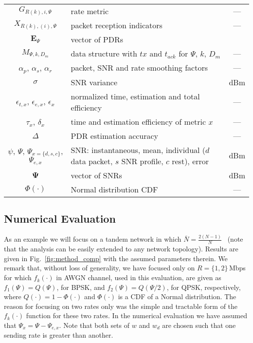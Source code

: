 \documentclass[11pt,draftclsnofoot,journal,onecolumn]{IEEEtran}
\begin{document}
\begin{table*}
\begin{tabular}{c|l|c}
  $G_{R(k),i,\Psi}$ & rate metric & --- \\
  $X_{R(k),(i),\Psi}$ & packet reception indicators & --- \\
  $\mathbf{E}_{\Psi}$ & vector of PDRs & \\
  $M_{\Psi,k,D_m}$ & data structure with $tx$ and $t_{ack}$ for $\Psi$, $k$, $D_m$ & --- \\
  $\alpha_p$, $\alpha_s$, $\alpha_r$ & packet, SNR and rate smoothing factors & --- \\
  $\sigma$ & SNR variance & dBm \\
  $\epsilon_{t,x}$, $\epsilon_{e,x}$, $\epsilon_{x}$ & normalized time, estimation and total efficiency & --- \\
  $\tau_x$, $\delta_x$ & time and estimation efficiency of metric $x$ & --- \\
  $\Delta$ & PDR estimation accuracy & --- \\
  $\psi$, $\Psi$, $\Psi_{x=\{d, s, c\}}$, $\Psi_{e,x}$ & SNR: instantaneous, mean, individual ($d$ data packet, $s$ SNR profile, $c$ rest), error & dBm \\
  $\mathbf{\Psi}$ & vector of SNRs & dBm\\
  $\Phi(\cdot)$ & Normal distribution CDF & --- \\
  \hline
\end{tabular}
\end{table*}

\subsection{Numerical Evaluation}

As an example we will focus on a tandem network in which $\bar{N}=\frac{2(N-1)}{N}$~\cite[Ch. 3]{Hekmat_phd_thesis} (note that the analysis can be easily extended to any network topology). Results are given in Fig.~\ref{fig:method_comp} with the assumed parameters therein. We remark that, without loss of generality, we have focused only on $R=\{1, 2\}$\,Mbps for which $f_{k}(\cdot)$ in AWGN channel, used in this evaluation, are given as $f_{1}(\Psi)=Q(\Psi)$, for BPSK, and $f_{2}(\Psi)=Q(\Psi/2)$, for QPSK, respectively, where $Q(\cdot)=1-\Phi(\cdot)$ and $\Phi(\cdot)$ is a CDF of a Normal distribution. The reason for focusing on two rates only was the simple and tractable form of the $f_{k}(\cdot)$ function for these two rates. In the numerical evaluation we have assumed that $\Psi_x=\Psi-\Psi_{e,x}$. Note that both sets of $w$ and $w_d$ are chosen such that one sending rate is greater than another.
\end{document}
